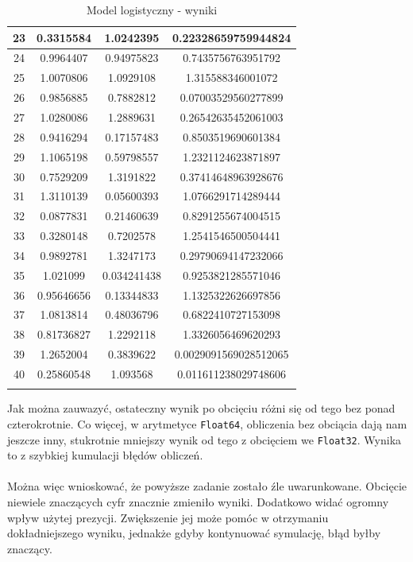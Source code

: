 \documentclass[15pt, a4paper]{article}
\begin{document}
\begin{longtable}{|c|c|c|c|}
        23 & 0.3315584 & 1.0242395 & 0.22328659759944824 \\ \hline
        24 & 0.9964407 & 0.94975823 & 0.7435756763951792 \\ \hline
        25 & 1.0070806 & 1.0929108 & 1.315588346001072 \\ \hline
        26 & 0.9856885 & 0.7882812 & 0.07003529560277899 \\ \hline
        27 & 1.0280086 & 1.2889631 & 0.26542635452061003 \\ \hline
        28 & 0.9416294 & 0.17157483 & 0.8503519690601384 \\ \hline
        29 & 1.1065198 & 0.59798557 & 1.2321124623871897 \\ \hline
        30 & 0.7529209 & 1.3191822 & 0.37414648963928676 \\ \hline
        31 & 1.3110139 & 0.05600393 & 1.0766291714289444 \\ \hline
        32 & 0.0877831 & 0.21460639 & 0.8291255674004515 \\ \hline
        33 & 0.3280148 & 0.7202578 & 1.2541546500504441 \\ \hline
        34 & 0.9892781 & 1.3247173 & 0.29790694147232066 \\ \hline
        35 & 1.021099 & 0.034241438 & 0.9253821285571046 \\ \hline
        36 & 0.95646656 & 0.13344833 & 1.1325322626697856 \\ \hline
        37 & 1.0813814 & 0.48036796 & 0.6822410727153098 \\ \hline
        38 & 0.81736827 & 1.2292118 & 1.3326056469620293 \\ \hline
        39 & 1.2652004 & 0.3839622 & 0.0029091569028512065 \\ \hline
        40 & 0.25860548 & 1.093568 & 0.011611238029748606 \\ \hline
    \caption{Model logistyczny - wyniki}
\end{longtable}

\vspace{0.5cm}

\noindent Jak można zauwazyć, ostateczny wynik po obcięciu różni się od tego bez ponad czterokrotnie. Co więcej, w arytmetyce \verb|Float64|, obliczenia bez obciącia dają nam jeszcze inny, stukrotnie mniejszy wynik od tego z obcięciem we \verb|Float32|. Wynika to z szybkiej kumulacji błędów obliczeń.\\\\
\noindent Można więc wnioskować, że powyższe zadanie zostało źle uwarunkowane. Obcięcie niewiele znaczących cyfr znacznie zmieniło wyniki. Dodatkowo widać ogromny wpływ użytej prezycji. Zwiększenie jej może pomóc w otrzymaniu dokładniejszego wyniku, jednakże gdyby kontynuować symulację, błąd byłby znaczący.
\end{document}
